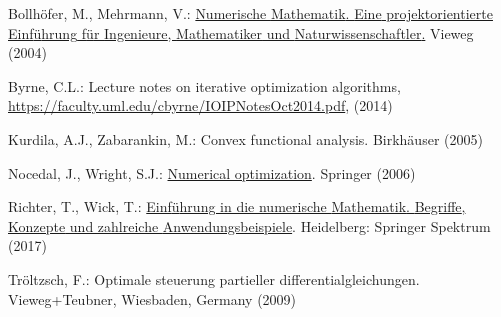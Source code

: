 \documentclass[
]{book}
\newlength{\cslhangindent}
\newlength{\cslentryspacingunit} %
\newenvironment{CSLReferences}[2] %
 {%
  \setlength{\parindent}{0pt}
  \ifodd #1
  \let\oldpar\par
  \def\par{\hangindent=\cslhangindent\oldpar}
  \fi
  \setlength{\parskip}{#2\cslentryspacingunit}
 }%
 {}
\theoremstyle{definition}
\theoremstyle{definition}
\theoremstyle{definition}
\theoremstyle{definition}
\theoremstyle{remark}
\begin{document}
\hypertarget{refs}{}
\begin{CSLReferences}{0}{0}
\leavevmode{}%
Bollhöfer, M., Mehrmann, V.: \href{https://doi.org/10.1007/978-3-322-80242-2}{Numerische {Mathematik}. {Eine} projektorientierte {Einf{ü}hrung} f{ü}r {Ingenieure}, {Mathematiker} und {Naturwissenschaftler}.} Vieweg (2004)

\leavevmode{}%
Byrne, C.L.: Lecture notes on iterative optimization algorithms, \url{https://faculty.uml.edu/cbyrne/IOIPNotesOct2014.pdf}, (2014)

\leavevmode{}%
Kurdila, A.J., Zabarankin, M.: Convex functional analysis. {Birkhäuser} (2005)

\leavevmode{}%
Nocedal, J., Wright, S.J.: \href{https://doi.org/10.1007/978-0-387-40065-5}{Numerical optimization}. Springer (2006)

\leavevmode{}%
Richter, T., Wick, T.: \href{https://doi.org/10.1007/978-3-662-54178-4}{Einf{ü}hrung in die numerische {Mathematik}. {Begriffe}, {Konzepte} und zahlreiche {Anwendungsbeispiele}}. Heidelberg: Springer Spektrum (2017)

\leavevmode{}%
Tröltzsch, F.: Optimale steuerung partieller differentialgleichungen. Vieweg+Teubner, Wiesbaden, Germany (2009)

\end{CSLReferences}
\end{document}
